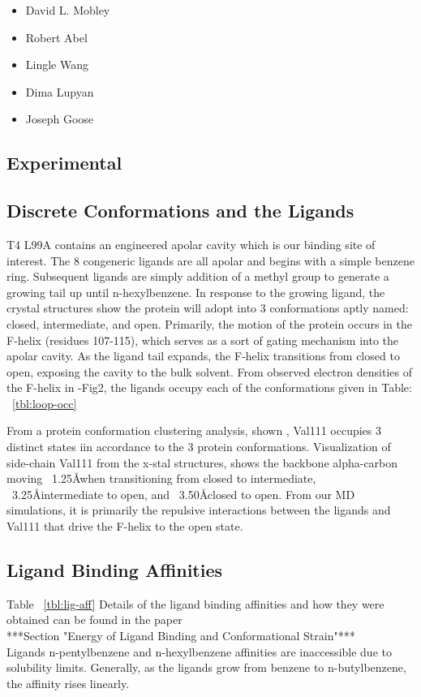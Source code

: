 \documentclass[journal=jctcce,manuscript=article]{achemso}
\begin{document}
\begin{acknowledgement}
\begin{itemize}
   \item David L. Mobley
   \item Robert Abel
   \item Lingle Wang
   \item Dima Lupyan
   \item Joseph Goose
\end{itemize}
\end{acknowledgement}

\begin{suppinfo}
\section{Experimental}
\subsection{Discrete Conformations and the Ligands}
T4 L99A contains an engineered apolar cavity which is our binding site of interest.
The 8 congeneric ligands are all apolar and begins with a simple benzene ring.
Subsequent ligands are simply addition of a methyl group to generate a growing tail up until n-hexylbenzene.
In response to the growing ligand, the crystal structures show the protein will adopt into 3 conformations aptly named: closed, intermediate, and open.
Primarily, the motion of the protein occurs in the F-helix (residues 107-115), which serves as a sort of gating mechanism into the apolar cavity.
As the ligand tail expands, the F-helix transitions from closed to open, exposing the cavity to the bulk solvent.
From observed electron densities of the F-helix in \cite{Merski2015}-Fig2, the ligands occupy each of the conformations given in Table: ~\ref{tbl:loop-occ}

From a protein conformation clustering analysis, shown \cite{Merski2015}, Val111 occupies 3 distinct states iin accordance to the 3 protein conformations.
Visualization of side-chain Val111 from the x-stal structures, shows the backbone alpha-carbon moving ~1.25\AA when transitioning from closed to intermediate, ~3.25\AA intermediate to open, and ~3.50\AA closed to open.
From our MD simulations, it is primarily the repulsive interactions between the ligands and Val111 that drive the F-helix to the open state.

\subsection{Ligand Binding Affinities}
Table ~\ref{tbl:lig-aff}
Details of the ligand binding affinities and how they were obtained can be found in the paper \cite{Merski2015} \\
***Section "Energy of Ligand Binding and Conformational Strain"***\\
Ligands n-pentylbenzene and n-hexylbenzene affinities are inaccessible due to solubility limits.
Generally, as the ligands grow from benzene to n-butylbenzene, the affinity rises linearly.


\end{suppinfo}
\end{document}
